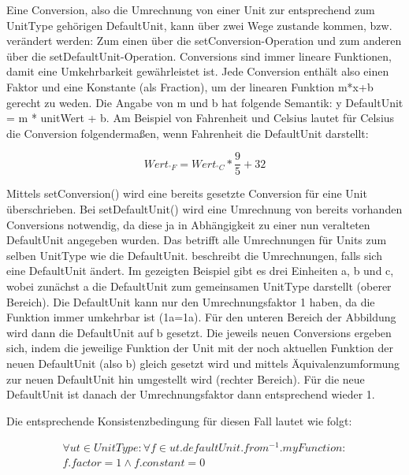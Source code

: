 \label{ConversionsKapitel} 

Eine Conversion, also die Umrechnung von einer Unit zur entsprechend zum UnitType gehörigen DefaultUnit, kann über zwei Wege zustande kommen, bzw. verändert werden: Zum einen über die setConversion-Operation und zum anderen über die setDefaultUnit-Operation.
Conversions sind immer lineare Funktionen, damit eine Umkehrbarkeit gewährleistet ist. Jede Conversion enthält also einen Faktor und eine Konstante (als Fraction), um der linearen Funktion m*x+b gerecht zu weden. Die Angabe von m und b hat folgende Semantik: y DefaultUnit = m * unitWert + b.
Am Beispiel von Fahrenheit und Celsius lautet für Celsius die Conversion folgendermaßen, wenn Fahrenheit die DefaultUnit darstellt:

\begin{equation} Wert_{^\circ F} = Wert_{^\circ C} * \frac{9}{5} + 32
\end{equation}

Mittels setConversion() wird eine bereits gesetzte Conversion für eine Unit überschrieben.
Bei setDefaultUnit() wird eine Umrechnung von bereits vorhanden Conversions notwendig, da diese ja in Abhängigkeit zu einer nun veralteten DefaultUnit angegeben wurden. Das betrifft alle Umrechnungen für Units zum selben UnitType wie die DefaultUnit.
 beschreibt die Umrechnungen, falls sich eine DefaultUnit ändert.
Im gezeigten Beispiel gibt es drei Einheiten a, b und c, wobei zunächst a die DefaultUnit zum gemeinsamen UnitType darstellt (oberer Bereich). Die DefaultUnit kann nur den Umrechnungsfaktor 1 haben, da die Funktion immer umkehrbar ist (1a=1a). Für den unteren Bereich der Abbildung wird dann die DefaultUnit auf b gesetzt. Die jeweils neuen Conversions ergeben sich, indem die jeweilige Funktion der Unit mit der noch aktuellen Funktion der neuen DefaultUnit (also b) gleich gesetzt wird und mittels Äquivalenzumformung zur neuen DefaultUnit hin umgestellt wird (rechter Bereich). Für die neue DefaultUnit ist danach der Umrechnungsfaktor dann entsprechend wieder 1.

Die entsprechende Konsistenzbedingung für diesen Fall lautet wie folgt:

\begin{equation} 
\begin{split}
\forall ut \in UnitType : \forall f \in ut.defaultUnit.from^{-1}.myFunction: \\
f.factor = 1 \wedge f.constant = 0 
\end{split}
\end{equation}

